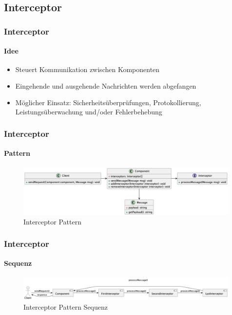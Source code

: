 \subsection{Interceptor}
\begin{frame}
  \frametitle{Interceptor}
  \framesubtitle{Idee}
  \begin{itemize}
    \item Steuert Kommunikation zwischen Komponenten
    \item Eingehende und ausgehende Nachrichten werden abgefangen
    \item Möglicher Einsatz: Sicherheitsüberprüfungen, Protokollierung, Leistungsüberwachung und/oder Fehlerbehebung
  \end{itemize}
\end{frame}

\begin{frame}
  \frametitle{Interceptor}
  \framesubtitle{Pattern}
  \begin{figure}[!ht]
    \centering
    \includegraphics[width=0.99\textwidth]{fig/uml/intercept-class.png}
    \caption{Interceptor Pattern}
    \label{fig:intercept-class}
  \end{figure}
\end{frame}

\begin{frame}
  \frametitle{Interceptor}
  \framesubtitle{Sequenz}
  \begin{figure}[!ht]
    \centering
    \includegraphics[width=0.99\textwidth]{fig/uml/intercept-seq.png}
    \caption{Interceptor Pattern Sequenz}
    \label{fig:intercept-seq}
  \end{figure}
\end{frame}